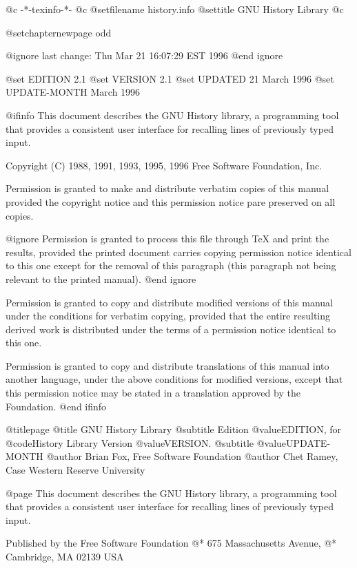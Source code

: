     @c -*-texinfo-*-
@c %
@setfilename history.info
@settitle GNU History Library
@c %

@setchapternewpage odd

@ignore
last change: Thu Mar 21 16:07:29 EST 1996
@end ignore

@set EDITION 2.1
@set VERSION 2.1
@set UPDATED 21 March 1996
@set UPDATE-MONTH March 1996

@ifinfo
This document describes the GNU History library, a programming tool that
provides a consistent user interface for recalling lines of previously
typed input.

Copyright (C) 1988, 1991, 1993, 1995, 1996 Free Software Foundation, Inc.

Permission is granted to make and distribute verbatim copies of
this manual provided the copyright notice and this permission notice
pare preserved on all copies.

@ignore
Permission is granted to process this file through TeX and print the
results, provided the printed document carries copying permission
notice identical to this one except for the removal of this paragraph
(this paragraph not being relevant to the printed manual).
@end ignore

Permission is granted to copy and distribute modified versions of this
manual under the conditions for verbatim copying, provided that the entire
resulting derived work is distributed under the terms of a permission
notice identical to this one.

Permission is granted to copy and distribute translations of this manual
into another language, under the above conditions for modified versions,
except that this permission notice may be stated in a translation approved
by the Foundation.
@end ifinfo

@titlepage
@title GNU History Library
@subtitle Edition @value{EDITION}, for @code{History Library} Version @value{VERSION}.
@subtitle @value{UPDATE-MONTH}
@author Brian Fox, Free Software Foundation
@author Chet Ramey, Case Western Reserve University

@page
This document describes the GNU History library, a programming tool that
provides a consistent user interface for recalling lines of previously
typed input.

Published by the Free Software Foundation @*
675 Massachusetts Avenue, @*
Cambridge, MA 02139 USA

